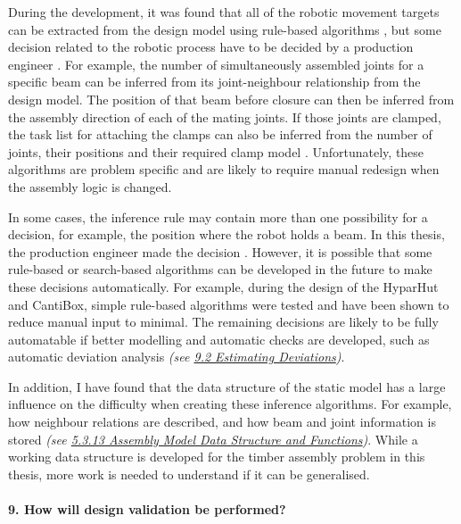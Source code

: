 During the development, it was found that all of the robotic movement targets can be extracted from the design model using rule-based algorithms , but some decision related to the robotic process have to be decided by a production engineer . For example, the number of simultaneously assembled joints for a specific beam can be inferred from its joint-neighbour relationship from the design model. The position of that beam before closure can then be inferred from the assembly direction of each of the mating joints. If those joints are clamped, the task list for attaching the clamps can also be inferred from the number of joints, their positions and their required clamp model . Unfortunately, these algorithms are problem specific and are likely to require manual redesign when the assembly logic is changed. 

In some cases, the inference rule may contain more than one possibility for a decision, for example, the position where the robot holds a beam. In this thesis, the production engineer made the decision . However, it is possible that some rule-based or search-based algorithms can be developed in the future to make these decisions automatically. For example, during the design of the HyparHut and CantiBox, simple rule-based algorithms were tested and have been shown to reduce manual input to minimal. The remaining decisions are likely to be fully automatable if better modelling and automatic checks are developed, such as automatic deviation analysis\textit{ (see \ul{9.2 Estimating Deviations})}.

In addition, I have found that the data structure of the static model has a large influence on the difficulty when creating these inference algorithms. For example, how neighbour relations are described, and how beam and joint information is stored \textit{(see \ul{5.3.13 Assembly Model Data Structure and Functions})}. While a working data structure is developed for the timber assembly problem in this thesis, more work is needed to understand if it can be generalised. 

\paragraph{9. How will design validation be performed?}

